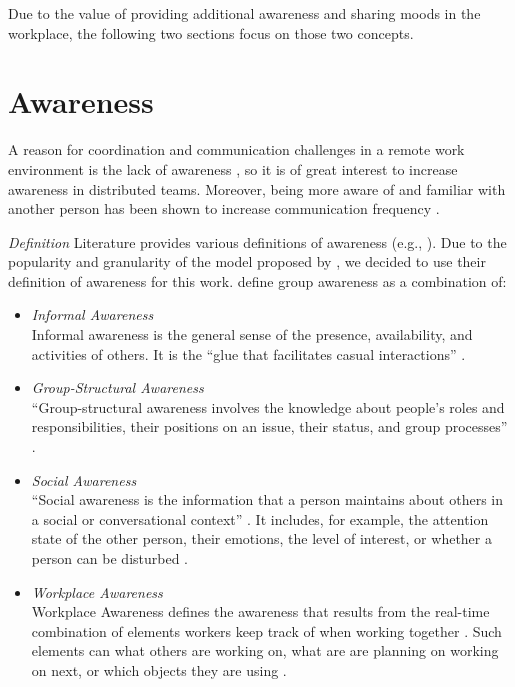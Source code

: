 Due to the value of providing additional awareness and sharing moods in the workplace, the following two sections focus on those two concepts.

\section{Awareness}
\label{section:awareness}
A reason for coordination and communication challenges in a remote work environment is the lack of awareness \autocite{herbsleb2007global, gutwin2004group}, so it is of great interest to increase awareness in distributed teams. Moreover, being more aware of and familiar with another person has been shown to increase communication frequency \autocite{chang2007out}.

\medskip\noindent\textit{Definition}
Literature provides various definitions of awareness (e.g., \autocite{chang2007out, gross2013supporting, gross2005user}). Due to the popularity and granularity of the model proposed by \textcite{gutwin1996workspace}, we decided to use their definition of awareness for this work. \textcite{gutwin1996workspace} define group awareness as a combination of:


\begin{itemize}[itemsep=0ex, parsep=1ex, leftmargin=*]
      \item \textit{Informal Awareness} \\
            Informal awareness is the general sense of the presence, availability, and activities of others. It is the \enquote{glue that facilitates casual interactions} \autocite[p.~6]{gutwin1996workspace}.
      \item \textit{Group-Structural Awareness} \\
            \enquote{Group-structural awareness involves the knowledge about people’s roles and responsibilities, their positions on an issue, their status, and group processes} \autocite[p.~6]{gutwin1996workspace}.
      \item \textit{Social Awareness} \\
            \enquote{Social awareness is the information that a person maintains about others in a social or conversational context} \autocite[p.~6]{gutwin1996workspace}. It includes, for example, the attention state of the other person, their emotions, the level of interest, or whether a person can be disturbed \autocite{gutwin1995support}.
      \item \textit{Workplace Awareness} \\
            Workplace Awareness defines the awareness that results from the real-time combination of elements workers keep track of when working together \autocite{gutwin1996workspace}. Such elements can what others are working on, what are are planning on working on next, or which objects they are using \autocite{gutwin1996workspace}.
\end{itemize}

